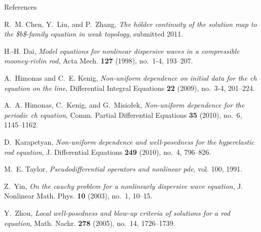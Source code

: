 \documentclass[handout]{beamer}
\numberwithin{equation}{section}
\begin{document}





\providecommand{\bysame}{\leavevmode\hbox to3em{\hrulefill}\thinspace}
\providecommand{\MR}{\relax\ifhmode\unskip\space\fi MR }
\providecommand{\MRhref}[2]{%
  \href{http://www.ams.org/mathscinet-getitem?mr=#1}{#2}
}
\providecommand{\href}[2]{#2}
\begin{frame}[allowframebreaks]{References} 
\begin{thebibliography}{HKM10}

R.~M. Chen, Y.~Liu, and P.~Zhang, \emph{The h{\"o}lder continuity of the
  solution map to the {\$}b{\$}-family equation in weak topology}, submitted 2011.

H.-H. Dai, \emph{Model equations for nonlinear dispersive waves in a
  compressible mooney-rivlin rod}, Acta Mech. \textbf{127} (1998), no.~1-4,
  193--207.

A.~Himonas and C.~E. Kenig, \emph{Non-uniform dependence on initial data for
  the ch equation on the line}, Differential Integral Equations \textbf{22}
  (2009), no.~3-4, 201--224.

A.~A. Himonas, C.~Kenig, and G.~Misio{\l}ek, \emph{Non-uniform dependence for
  the periodic ch equation}, Comm. Partial Differential Equations \textbf{35}
  (2010), no.~6, 1145--1162.

D.~Karapetyan, \emph{Non-uniform dependence and well-posedness for the
  hyperelastic rod equation}, J. Differential Equations \textbf{249} (2010),
  no.~4, 796--826.

M.~E. Taylor, \emph{Pseudodifferential operators and nonlinear pde}, vol. 100,
  1991.

Z.~Yin, \emph{On the cauchy problem for a nonlinearly dispersive wave
  equation}, J. Nonlinear Math. Phys. \textbf{10} (2003), no.~1, 10--15.

Y.~Zhou, \emph{Local well-posedness and blow-up criteria of solutions for a rod
  equation}, Math. Nachr. \textbf{278} (2005), no.~14, 1726--1739.

\end{thebibliography}

\end{frame} 

%
%
\end{document}
